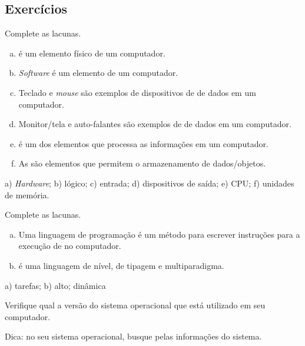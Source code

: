 \subsection{Exercícios}


\begin{exer}
  Complete as lacunas.
  \begin{enumerate}[a)]
    \item \underline{} é um elemento físico de um computador.
    \item \textit{Software} é um elemento \underline{\phantom{lógico}} de um computador.
    \item Teclado e \textit{mouse} são exemplos de dispositivos de \underline{\phantom{entrada}} de dados em um computador.
    \item Monitor/tela e auto-falantes são exemplos de \underline{\phantom{dispositivos de saída}} de dados em um computador.
    \item \underline{\phantom{CPU}} é um dos elementos que processa as informações em um computador.
    \item As \underline{\phantom{unidades de memória}} são elementos que permitem o armazenamento de dados/objetos.
  \end{enumerate}
\end{exer}
\begin{resp}
  a) \textit{Hardware}; b) lógico; c) entrada; d) dispositivos de saída; e) CPU; f) unidades de memória.
\end{resp}

\begin{exer}
  Complete as lacunas.
  \begin{enumerate}[a)]
    \item Uma linguagem de programação é um método para escrever instruções para a execução de \underline{\phantom{tarefas}} no computador.
    \item {\python} é uma linguagem de \underline{\phantom{alto}} nível, de tipagem \underline{\phantom{dinâmica}} e multiparadigma.
  \end{enumerate}
\end{exer}
\begin{resp}
  a) tarefas; b) alto; dinâmica
\end{resp}


\begin{exer}
  Verifique qual a versão do sistema operacional que está utilizado em seu computador.
\end{exer}
\begin{resp}
  Dica: no seu sistema operacional, busque pelas informações do sistema.
\end{resp}


